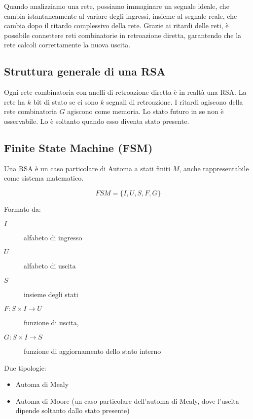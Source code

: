 \documentclass{subfiles}
\begin{document}
\noindent
Quando analizziamo una rete, possiamo immaginare un segnale ideale, che cambia istantaneamente al variare degli ingressi, insieme al segnale reale, che cambia dopo il ritardo complessivo della rete.
Grazie ai ritardi delle reti, è possibile connettere reti combinatorie in retroazione diretta, garantendo che la rete calcoli correttamente la nuova uscita.

\subsection{Struttura generale di una RSA}

Ogni rete combinatoria con anelli di retroazione diretta è in realtà una RSA.
La rete ha $k$ bit di stato se ci sono $k$ segnali di retroazione.
I ritardi agiscono della rete combinatoria $G$ agiscono come memoria.
Lo stato futuro in se non è osservabile.
Lo è soltanto quando esso diventa stato presente.

\subsection{Finite State Machine (FSM)}

Una RSA è un caso particolare di Automa a stati finiti $M$, anche rappresentabile come sistema matematico.

$$
FSM = \{I,U,S,F,G\}
$$

\noindent
Formato da:

\begin{description}
    \item[$I$] alfabeto di ingresso
    \item[$U$] alfabeto di uscita
    \item[$S$] insieme degli stati
\end{description}

\begin{description}
    \item[$F: S \times I \to U$] funzione di uscita,
    \item[$G: S \times I \to S$] funzione di aggiornamento dello stato interno
\end{description}

\noindent
Due tipologie:

\begin{itemize}
    \item Automa di Mealy
    \item Automa di Moore (un caso particolare dell'automa di Mealy, dove l'uscita dipende soltanto dallo stato presente)
\end{itemize}
\end{document}
